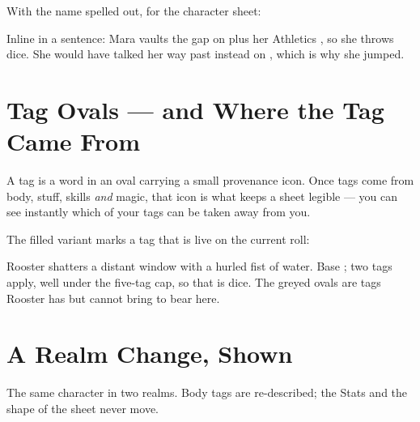 \documentclass[11pt,oneside]{memoir}
\begin{document}
\bigskip
{}\quad {}\quad {}

\bigskip
With the name spelled out, for the character sheet:

\bigskip
{}\quad
{}\quad
{}

\bigskip
Inline in a sentence: Mara vaults the gap on  plus her
Athletics , so she throws  dice. She would have talked her
way past instead on , which is why she jumped.

\section*{Tag Ovals --- and Where the Tag Came From}

A tag is a word in an oval carrying a small provenance icon. Once tags come
from body, stuff, skills \emph{and} magic, that icon is what keeps a sheet
legible --- you can see instantly which of your tags can be taken away from
you.

\bigskip
{}\quad
{}\quad
{}\quad
{}\quad
{}\quad
{}\quad
{}

\bigskip
The filled variant marks a tag that is live on the current roll:

\bigskip
{}\quad
{}\quad
{}\quad
{}\quad
{}

\smallskip
\begin{example}
Rooster shatters a distant window with a hurled fist of water. Base
; two tags apply, well under the five-tag cap, so that
is  dice. The greyed
ovals are tags Rooster has but cannot bring to bear here.
\end{example}

\section*{A Realm Change, Shown}

The same character in two realms. Body tags are re-described; the Stats and
the shape of the sheet never move.
\end{document}
